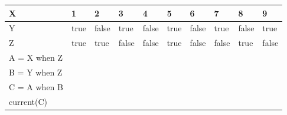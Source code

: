 \begin{tabular}{|l|l|l|l|l|l|l|l|l|l|}
  \hline
  X              &  1 & 2 & 3 & 4 & 5 & 6 & 7 & 8 & 9 \\\hline
  Y              & true & false & true & false & true & false & true & false &
                   true \\\hline
  Z              & true & true & false & false & true & false & false & true &
                   false \\\hline
  A = X when Z   & & & & & & & & &\\\hline
  B = Y when Z   & & & & & & & & &\\\hline
  C = A when B   & & & & & & & & &\\\hline
  current(C)   & & & & & & & & &\\\hline
\end{tabular}
